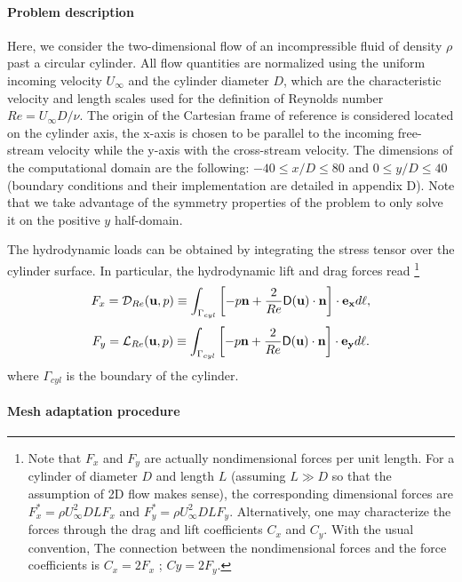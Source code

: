\documentclass[twocolumn,10pt]{asme2ej}
\newcommand{\be}[1]{ \begin{equation} \label{#1}}
\newcommand{\ee}{\end{equation}}
\begin{document}
\paragraph{Problem description}
Here, we consider the two-dimensional flow of an incompressible fluid of density $\rho$ past a circular cylinder. 
All flow quantities are normalized using the uniform incoming velocity $U_{\infty}$ and the cylinder diameter $D$,  which are the characteristic velocity and length scales used for the definition of Reynolds number $Re= U_{\infty} D / \nu$.
The origin of the Cartesian frame of reference is considered located on the cylinder axis, the x-axis is chosen to be parallel to 
the incoming free-stream velocity while the y-axis with the cross-stream velocity. The dimensions of the computational domain are the following: $-40 \le x/D \le 80$ and $0 \le y/D \le 40$ (boundary conditions and their implementation are detailed in appendix D).
Note that we take advantage of the symmetry properties of the problem to only solve it on the positive $y$ half-domain. 

The hydrodynamic loads can be obtained by integrating the stress tensor over the cylinder surface.
In particular, the hydrodynamic lift and drag forces read
\footnote{ Note that $F_x$ and $F_y$ are actually nondimensional forces per unit length. 
For a cylinder of diameter $D$ and length $L$ (assuming $L\gg D$ so that the assumption of 2D flow makes sense), 
the corresponding dimensional forces are $F_x^* = \rho U_\infty^2 D L F_x $ and $F_y^* = \rho U_\infty^2 D L F_y$. 
Alternatively, one may characterize the forces through the drag and lift coefficients $C_x$ and $C_y$. With the usual convention, 
The connection between the nondimensional forces and the force coefficients is $C_x = 2 F_x$ ; $Cy = 2 F_y$.
}
\be{drag}
F_x = {\cal D}_{Re} ({\bf u},p) \equiv 
  \int_{\Gamma_{cyl}} \left[-p {\bf n} + \frac{2}{Re} {\mathsf{D}}({\bf u}) \cdot {\bf n} \right]   \cdot {\bf e_x} d\ell,
\ee
\be{lift}
F_y = {\cal L}_{Re} ({\bf u},p) \equiv
  \int_{\Gamma_{cyl}} \left[-p {\bf n} + \frac{2}{Re} {\mathsf{D}}({\bf u}) \cdot {\bf n} \right]   \cdot {\bf e_y} d\ell. 
\ee
where $\Gamma_{cyl}$ is the boundary of the cylinder. %


\paragraph{Mesh adaptation procedure}
\end{document}
